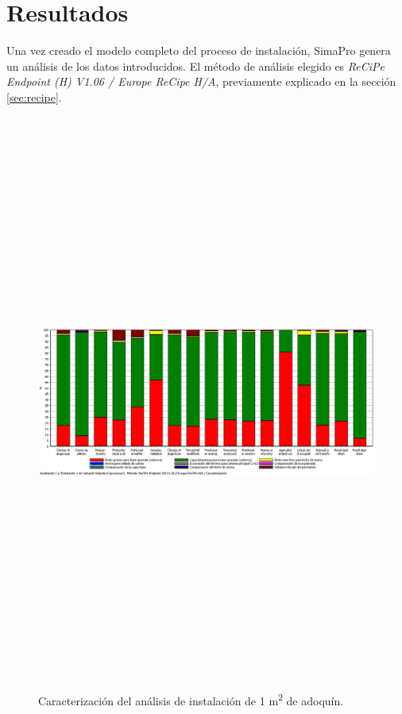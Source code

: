 \section{Resultados}

Una vez creado el modelo completo del proceso de instalación, SimaPro genera un análisis de los datos introducidos. El método de análisis elegido es \textit{ReCiPe Endpoint (H) V1.06 / Europe ReCipe H/A}, previamente explicado en la sección \ref{sec:recipe}.

\begin{figure}[!htb]
\centering
\includegraphics[angle=90,height=19cm]{instalacion_caracterizacion.png}
\caption{Caracterización del análisis de instalación de 1 \si{m^2} de adoquín.}
\label{fig:caracterizacioninstalacion}
\end{figure}

